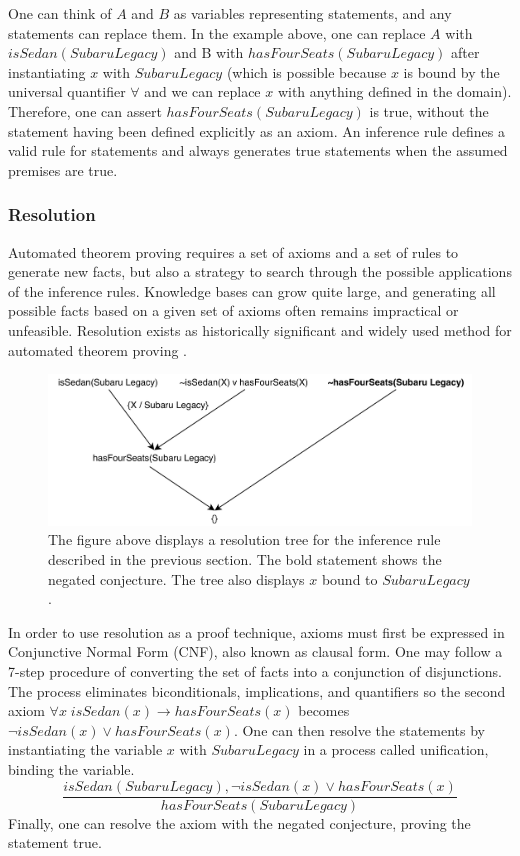 \documentclass{article}
\begin{document}
One can think of $A$ and $B$ as variables representing statements, and any statements can replace them. In the example above, one can replace $A$ with $isSedan(Subaru Legacy)$ and B with $hasFourSeats(SubaruLegacy)$ after instantiating $x$ with $Subaru Legacy$ (which is possible because $x$ is bound by the universal quantifier $\forall$ and we can replace $x$ with anything defined in the domain). Therefore, one can assert $hasFourSeats(Subaru Legacy)$ is true, without the statement having been defined explicitly as an axiom. An inference rule defines a valid rule for statements and always generates true statements when the assumed premises are true. 
\subsubsection{Resolution}

Automated theorem proving requires a set of axioms and a set of rules to generate new facts, but also a strategy to search through the possible applications of the inference rules. Knowledge bases can grow quite large, and generating all possible facts based on a given set of axioms often remains impractical or unfeasible. Resolution exists as historically significant and widely used method for automated theorem proving \cite[51]{ertel2018introduction}. 

\begin{figure}[h]
\centering
\includegraphics[width=6in]{resolution_tree}
\caption{The figure above displays a resolution tree for the inference rule described in the previous section. The bold statement shows the negated conjecture. The tree also displays $x$ bound to $SubaruLegacy$.}
\label{fig:resolution_tree}
\end{figure}

In order to use resolution as a proof technique, axioms must first be expressed in Conjunctive Normal Form (CNF), also known as clausal form. One may follow a 7-step procedure of converting the set of facts into a conjunction of disjunctions. The process eliminates biconditionals, implications, and quantifiers so the second axiom $\forall x \; isSedan(x) \rightarrow hasFourSeats(x)$ becomes 
$\lnot isSedan(x) \lor hasFourSeats(x)$. One can then resolve the statements by instantiating the variable $x$ with $SubaruLegacy$ in a process called unification, binding the variable. 
\[\frac{isSedan(Subaru Legacy), \lnot isSedan(x) \lor hasFourSeats(x)}{hasFourSeats(Subaru Legacy)}\]
Finally, one can resolve the axiom with the negated conjecture, proving the statement true. 
\end{document}
